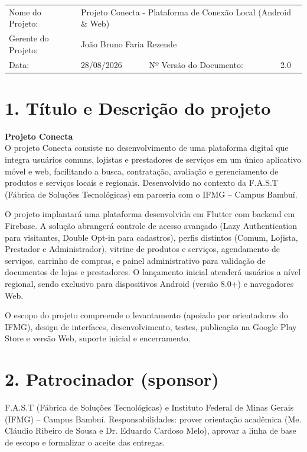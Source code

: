 \documentclass[11pt, a4paper]{article}
\begin{document}
\begin{center}
\renewcommand{\arraystretch}{1.5}
\begin{tabularx}{\textwidth}{|X|X|l|l|}
\hline
\rowcolor{headerblue}
\multicolumn{4}{|c|}{\textcolor{white}{\textbf{\Large DECLARAÇÃO DE ESCOPO}}} \\
\hline
Nome do Projeto: & \multicolumn{3}{l|}{Projeto Conecta - Plataforma de Conexão Local (Android \& Web)} \\
\hline
Gerente do Projeto: & \multicolumn{3}{l|}{João Bruno Faria Rezende} \\
\hline
Data: & 28/08/2026 & Nº Versão do Documento: & 2.0 \\
\hline
\end{tabularx}
\end{center}

\vspace{0.5cm}

\section*{\textcolor{headerblue}{1. Título e Descrição do projeto}}
\textbf{Projeto Conecta}\\
O projeto Conecta consiste no desenvolvimento de uma plataforma digital que integra usuários comuns, lojistas e prestadores de serviços em um único aplicativo móvel e web, facilitando a busca, contratação, avaliação e gerenciamento de produtos e serviços locais e regionais. Desenvolvido no contexto da F.A.S.T (Fábrica de Soluções Tecnológicas) em parceria com o IFMG – Campus Bambuí.

O projeto implantará uma plataforma desenvolvida em Flutter com backend em Firebase. A solução abrangerá controle de acesso avançado (Lazy Authentication para visitantes, Double Opt-in para cadastros), perfis distintos (Comum, Lojista, Prestador e Administrador), vitrine de produtos e serviços, agendamento de serviços, carrinho de compras, e painel administrativo para validação de documentos de lojas e prestadores. O lançamento inicial atenderá usuários a nível regional, sendo exclusivo para dispositivos Android (versão 8.0+) e navegadores Web.

O escopo do projeto compreende o levantamento (apoiado por orientadores do IFMG), design de interfaces, desenvolvimento, testes, publicação na Google Play Store e versão Web, suporte inicial e encerramento.

\section*{\textcolor{headerblue}{2. Patrocinador (sponsor)}}
F.A.S.T (Fábrica de Soluções Tecnológicas) e Instituto Federal de Minas Gerais (IFMG) – Campus Bambuí. Responsabilidades: prover orientação acadêmica (Me. Cláudio Ribeiro de Sousa e Dr. Eduardo Cardoso Melo), aprovar a linha de base de escopo e formalizar o aceite das entregas.
\end{document}
